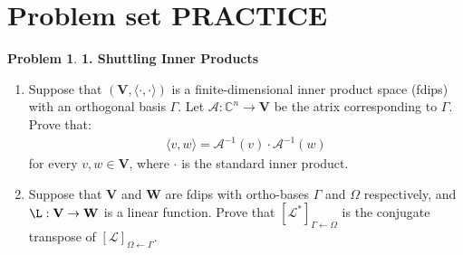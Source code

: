 \documentclass{book}
\theoremstyle{definition}
\newtheorem*{prob*}{Problem}
\newcommand{\V}{\mathbf{V}}
\newcommand{\W}{\mathbf{W}}
\newcommand{\A}{\mathcal{A}}
\newcommand{\lag}{\mathcal{L}}
\newcommand{\la}{\langle}
\newcommand{\ra}{\rangle}
\begin{document}
\newpage












































\section{Problem set PRACTICE}

\begin{prob*}\textbf{1. Shuttling Inner Products}
	\begin{enumerate}
		\item Suppose that $\left( \V, \la \cdot, \cdot\ra \right)$ is a finite-dimensional inner product space (fdips) with an orthogonal basis $\Gamma$. Let $\A : \mathbb{C}^n \to \V$ be the atrix corresponding to $\Gamma$. Prove that:
		\begin{align*}
		\la v,w \ra = \A^{-1}(v) \cdot \A^{-1}(w)
		\end{align*}
		for every $v,w\in \V$, where $\cdot$ is the standard inner product. 
		
		
		
		
		
		\item Suppose that $\V$ and $\W$ are fdips with ortho-bases $\Gamma$ and $\Omega$ respectively, and $\L : \V \to \W$ is a linear function. Prove that $[\lag^*]_{\Gamma\leftarrow\Omega}$ is the conjugate transpose of $[\lag]_{\Omega\leftarrow\Gamma}$.
	\end{enumerate}
	
\end{prob*}
\end{document}
